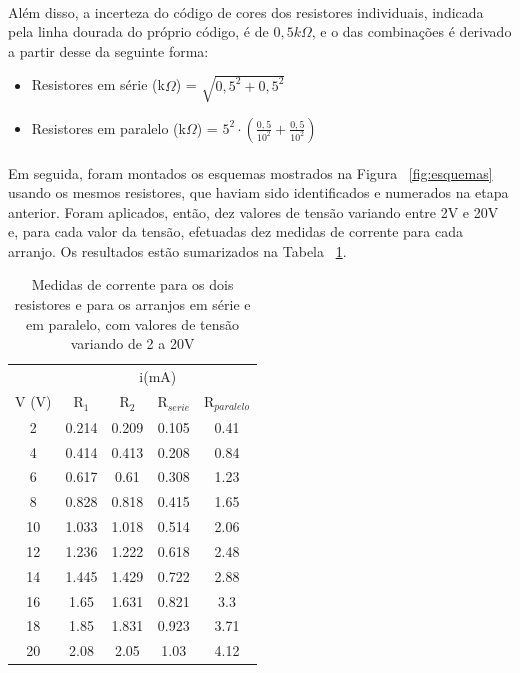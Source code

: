 \documentclass[11pt,a4paper]{article}
\begin{document}
    \paragraph{}
    Além disso, a incerteza do código de cores dos resistores individuais, indicada pela linha dourada do próprio código, é de $0,5k\Omega$, e o das combinações é derivado a partir desse da seguinte forma:
      \begin{itemize}
        \item Resistores em série (k$\Omega$) = $\sqrt{0,5^{2} + 0,5^{2}}$
        \item Resistores em paralelo (k$\Omega$) = $5^{2}\cdot(\frac{0,5}{10^{2}}+ \frac{0,5}{10^{2}})$
      \end{itemize} 
      
    \paragraph{}
    Em seguida, foram montados os esquemas mostrados na Figura ~\ref{fig:esquemas} usando os mesmos resistores, que haviam sido identificados e numerados na etapa anterior. Foram aplicados, então, dez valores de tensão variando entre 2V e 20V e, para cada valor da tensão, efetuadas dez medidas de corrente para cada arranjo. Os resultados estão sumarizados na Tabela ~\ref{tab:indiretas}.
     
      \begin{table}[htb!]
        \centering
        \begin{tabular}{c|cccc}
         \toprule
                & \multicolumn{4}{c}{i(mA)}        \\
          V (V) & R$_1$   & R$_2$   & R$_{serie}$  & R$_{paralelo}$ \\
          \midrule
          2     & 0.214   & 0.209   & 0.105        & 0.41            \\
          4     & 0.414   & 0.413   & 0.208        & 0.84            \\
          6     & 0.617   & 0.61    & 0.308        & 1.23            \\
          8     & 0.828   & 0.818   & 0.415        & 1.65            \\
          10    & 1.033   & 1.018   & 0.514        & 2.06            \\
          12    & 1.236   & 1.222   & 0.618        & 2.48            \\
          14    & 1.445   & 1.429   & 0.722        & 2.88            \\
          16    & 1.65    & 1.631   & 0.821        & 3.3             \\
          18    & 1.85    & 1.831   & 0.923        & 3.71            \\
          20    & 2.08    & 2.05    & 1.03         & 4.12            \\
          \bottomrule
        \end{tabular}
        \caption{Medidas de corrente para os dois resistores e para os arranjos em série e em paralelo, com valores de tensão variando de 2 a 20V}
        \label{tab:indiretas}
      \end{table}
\end{document}
